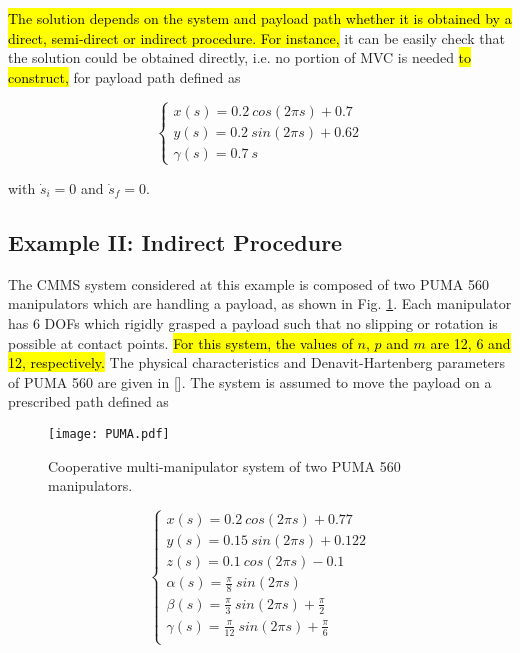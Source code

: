 \documentclass{rob}%
\begin{document}
\hl{The solution depends on the system and payload path whether it is obtained by a direct, semi-direct or indirect procedure.  For instance,} it can be easily check that the solution could be obtained directly, i.e. no portion of MVC is needed \hl{to construct,} for payload path defined as

\begin{equation}
\label{eq:Path2}
\begin{cases}
x(s)=0.2 \ cos(2 \pi s)+0.7 \\
y(s)=0.2 \ sin(2 \pi s)+0.62 \\
\gamma(s)=0.7 \ s 
\end{cases}
\end{equation}

\noindent
with $ \dot s_i=0 $ and $ \dot s_f=0 $.


\subsection{Example II: Indirect Procedure}

The CMMS system considered at this example is composed of two PUMA 560 manipulators which are handling a payload, as shown in Fig. \ref{fig:PUMA560}. 
Each manipulator has 6 DOFs which rigidly grasped a payload such that no slipping or rotation is possible at contact points. \hl{For this system, the values of $ n $, $ p $ and $ m $ are 12, 6 and 12, respectively.} The physical characteristics and Denavit-Hartenberg parameters of PUMA 560 are given in [].
The system is assumed to move the payload on a prescribed path defined as


\begin{figure}[!t]
	\centering
	\texttt{[image: PUMA.pdf]}
	\caption{Cooperative multi-manipulator system of two PUMA 560 manipulators.}
	\label{fig:PUMA560}
\end{figure}

\begin{equation}
\label{eq:Path3}
\begin{cases}
x(s)=0.2 \ cos(2 \pi s)+0.77 \\
y(s)=0.15 \ sin(2 \pi s)+0.122 \\
z(s)=0.1 \ cos(2 \pi s)-0.1 \\
\alpha(s)=\frac{\pi}{8} \ sin(2 \pi s) \\
\beta(s)=\frac{\pi}{3} \ sin(2 \pi s)+\frac{\pi}{2} \\
\gamma(s)=\frac{\pi}{12} \ sin(2 \pi s)+\frac{\pi}{6} \\
\end{cases}
\end{equation}
\end{document}
